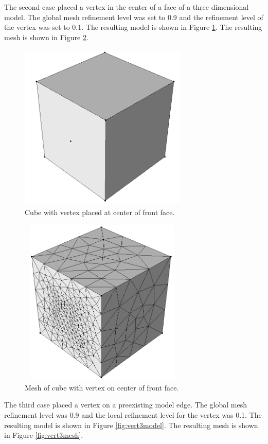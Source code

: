 \documentclass[a4paper, 12pt]{article}
\begin{document}
The second case placed a vertex in the center of a face of a three dimensional 
model. The global mesh refinement level was set to 0.9 and the refinement
level of the vertex was set to 0.1. 
The resulting model is shown in Figure \ref{fig:vert2model}.
The resulting mesh is shown in Figure \ref{fig:vert2mesh}.

\begin{figure}[H]
  \centering
  \includegraphics[width=8cm, height=8cm]{test4_smd}
  \caption{Cube with vertex placed at center of front face.}
  \label{fig:vert2model}
\end{figure}

\begin{figure}[H]
  \centering
  \includegraphics[width=8cm, height=8cm]{test4_sms}
  \caption{Mesh of cube with vertex on center of front face.}
  \label{fig:vert2mesh}
\end{figure}

The third case placed a vertex on a preexisting model edge. The global
mesh refinement level was 0.9 and the local refinement level for the
vertex was 0.1.
The resulting model is shown in Figure \ref{fig:vert3model}.
The resulting mesh is shown in Figure \ref{fig:vert3mesh}.
\end{document}
